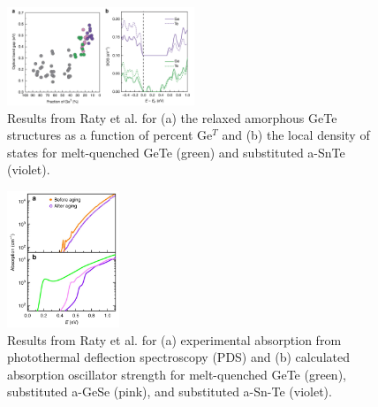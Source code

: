 \documentclass[3p,review,12pt]{elsarticle}
\begin{document}
\begin{figure}[H]
	\includegraphics[width=0.5\textwidth]{raty2}
	\centering
	\caption{Results from Raty et al. \cite{Raty2015} for (a) the relaxed amorphous GeTe structures as a function of percent Ge$^{T}$ and (b) the local density of states for melt-quenched GeTe (green) and substituted a-SnTe (violet).}
\end{figure}

\begin{figure}[H]
	\includegraphics[width=0.3\textwidth]{raty3}
	\centering
	\caption{Results from Raty et al. \cite{Raty2015} for (a) experimental absorption from photothermal deflection spectroscopy (PDS) and (b) calculated absorption oscillator strength for melt-quenched GeTe (green), substituted a-GeSe (pink), and substituted a-Sn-Te (violet). } 
\end{figure}
\end{document}
